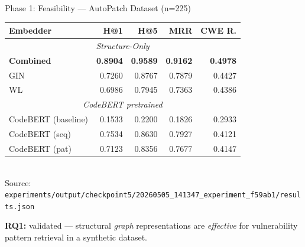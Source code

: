 \documentclass[aspectratio=169,10pt]{beamer}
\begin{document}

\begin{frame}{Phase 1: Feasibility — AutoPatch Dataset (n=225)}

  \vspace{0.3cm}
  \begin{table}
    \centering
    \small
    \begin{tabular}{lrrrr}
      \toprule
      \textbf{Embedder} & \textbf{H@1} & \textbf{H@5} & \textbf{MRR} & \textbf{CWE R.} \\
      \midrule
      \multicolumn{5}{c}{\textit{Structure-Only}} \\
      \midrule
      \textbf{Combined} & \textbf{0.8904} & \textbf{0.9589} & \textbf{0.9162} & \textbf{0.4978} \\
      GIN & 0.7260 & 0.8767 & 0.7879 & 0.4427 \\
      WL & 0.6986 & 0.7945 & 0.7363 & 0.4386 \\
      \midrule
      \multicolumn{5}{c}{\textit{CodeBERT pretrained}} \\
      \midrule
      CodeBERT (baseline) & 0.1533 & 0.2200 & 0.1826 & 0.2933 \\
      CodeBERT (seq) & 0.7534 & 0.8630 & 0.7927 & 0.4121 \\
CodeBERT (pat) & 0.7123 & 0.8356 & 0.7677 & 0.4147 \\      \bottomrule
    \end{tabular}
    \\[2pt]
    {\tiny\textcolor{notecol}{Source: \texttt{experiments/output/checkpoint5/20260505\_141347\_experiment\_f59ab1/results.json}}}
  \end{table}

  
  \textbf{RQ1:} validated — structural \textit{graph} representations are \textit{effective} for vulnerability pattern retrieval in a synthetic dataset.
\end{frame}
\end{document}
